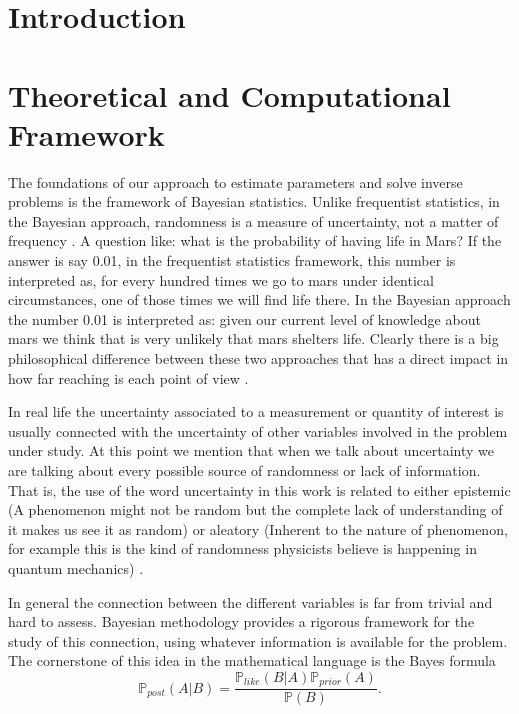 \documentclass[12pt]{book}
\newcommand{\post}{\mathbb{P}_{post}}
\newcommand{\like}{\mathbb{P}_{like}}
\newcommand{\prior}{\mathbb{P}_{prior}}
\newcommand{\p}{\mathbb{P}}
\begin{document}
\chapter{Introduction}

\newpage

\chapter{Theoretical and Computational Framework}


The foundations of  our approach to estimate parameters and solve inverse problems is  the 
framework of Bayesian statistics. Unlike frequentist statistics, in the Bayesian approach, randomness
is a measure of uncertainty,  not a matter of frequency . A question like:
what is the probability of having  life in Mars? If the answer is say 0.01, in the frequentist
statistics framework, this number is interpreted as, for every hundred times we go to 
mars under identical circumstances, one of those times we will find life there. In the Bayesian
approach the number 0.01 is interpreted as: given our current level of knowledge about mars
we think that is very unlikely that mars shelters life. Clearly there is a big philosophical
difference between these two approaches that has a direct impact in how far reaching is each point of view  \cite{jaynes2003probability}.


In real life the uncertainty associated to a  measurement or  quantity of interest is usually 
connected  with the uncertainty  of other variables involved in the problem under study. 
At this point we mention that when we talk about uncertainty we are talking about every possible 
source of randomness  or  lack of information. That is, the use of the word uncertainty in this work
is related to either epistemic (A phenomenon might not be random but the complete lack of 
understanding of it makes us see it as random) or aleatory (Inherent to the nature of phenomenon, for 
example this is the kind of randomness physicists believe is happening in quantum mechanics)
\cite{kennedy2001bayesian}.

In general the connection between the different variables is far from trivial and hard to assess.
Bayesian methodology provides a rigorous framework for the study of 
this connection, using whatever information
is available for the problem. The cornerstone of this idea
in the mathematical language is the  Bayes formula 
\begin{equation}\label{eqnBayes}
\post(A|B)=\frac{\like(B|A)\prior(A)}{\p(B)}.
\end{equation}
\end{document}
